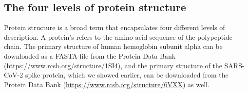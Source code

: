 \FloatBarrier
{}
\subsection{The four levels of protein structure}

Protein structure is a broad term that encapsulates four different levels of description. A protein's  refers to the amino acid sequence of the polypeptide chain. The primary structure of human hemoglobin subunit alpha can be downloaded as a FASTA file from the Protein Data Bank (\url{https://www.rcsb.org/structure/1SI4}), and the primary structure of the SARS-CoV-2 spike protein, which we showed earlier, can be downloaded from the Protein Data Bank (\url{https://www.rcsb.org/structure/6VXX}) as well.


